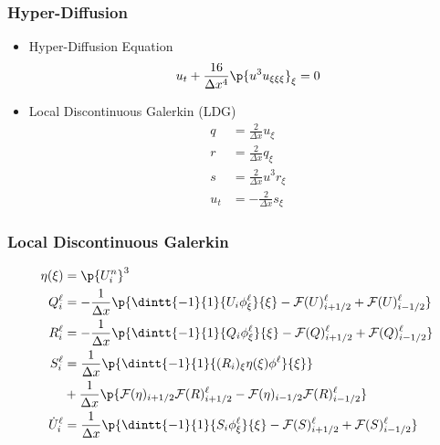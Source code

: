 \documentclass[10pt]{beamer}
\begin{document}
    \begin{frame}
      \frametitle{Hyper-Diffusion}
      \begin{itemize}
        \item Hyper-Diffusion Equation
          \[
            u_t + \frac{16}{\Delta x^4} \p{u^3 u_{\xi\xi\xi}}_\xi = 0
          \]

        \item Local Discontinuous Galerkin (LDG)
          \begin{align*}
            q &= \frac{2}{\Delta x} u_{\xi} \\
            r &= \frac{2}{\Delta x} q_{\xi} \\
            s &= \frac{2}{\Delta x} u^3 r_{\xi} \\
            u_t &= -\frac{2}{\Delta x} s_{\xi}
          \end{align*}
      \end{itemize}
    \end{frame}

    \begin{frame}
      \frametitle{Local Discontinuous Galerkin}
      \begin{align*}
        \eta(\xi) &= \p{U_i^{n}}^3 \\
        Q_i^{\ell} &= -\frac{1}{\Delta x} \p{\dintt{-1}{1}{U_i \phi_{\xi}^{\ell}}{\xi}
        - \mcF(U)_{i+1/2}^{\ell} + \mcF(U)_{i - 1/2}^{\ell}} \\
        R_i^{\ell} &= -\frac{1}{\Delta x} \p{\dintt{-1}{1}{Q_i \phi_{\xi}^{\ell}}{\xi}
        - \mcF(Q)_{i+1/2}^{\ell} + \mcF(Q)_{i - 1/2}^{\ell}} \\
        S_i^{\ell} &= \frac{1}{\Delta x} \p{\dintt{-1}{1}{(R_i)_{\xi} \eta(\xi) \phi^{\ell}}{\xi}} \\
        &+ \frac{1}{\Delta x}\p{\mcF(\eta)_{i + 1/2} \mcF(R)_{i+1/2}^{\ell} - \mcF(\eta)_{i-1/2} \mcF(R)_{i-1/2}^{\ell}}\\
        \dot{U}_i^{\ell} &= \frac{1}{\Delta x} \p{\dintt{-1}{1}{S_i \phi_{\xi}^{\ell}}{\xi}
        - \mcF(S)_{i+1/2}^{\ell} + \mcF(S)_{i - 1/2}^{\ell}}
      \end{align*}
    \end{frame}
\end{document}

